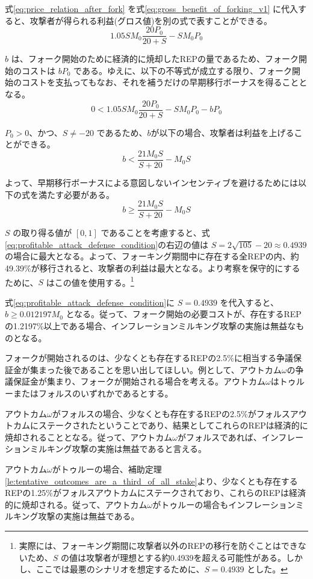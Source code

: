 \documentclass[floatfix,reprint,nofootinbib,amsmath,amssymb,epsfig,pre,floats,letterpaper,groupedaffiliation]{revtex4-1}
\newcommand{\beq}{\begin{equation}}
\newcommand{\eeq}{\end{equation}}
\theoremstyle{definition}
\theoremstyle{definition}
\theoremstyle{definition}
\begin{document}
\begin{appendix}
式\ref{eq:price_relation_after_fork} を式\ref{eq:gross_benefit_of_forking_v1} に代入すると、攻撃者が得られる利益(グロス値)を別の式で表すことができる。
\beq\label{eq:gross_benefit_of_forking_v2}
1.05SM_{0}\frac{20P_{0}}{20+S}-SM_{0}P_{0}
\eeq

$b$ は、フォーク開始のために経済的に焼却したREPの量であるため、フォーク開始のコストは $bP_0$ である。ゆえに、以下の不等式が成立する限り、フォーク開始のコストを支払ってもなお、それを補うだけの早期移行ボーナスを得ることとなる。
\beq\label{eq:profitable_attack_inequality}
0<1.05SM_{0}\frac{20P_{0}}{20+S}-SM_{0}P_{0}-bP_{0}
\eeq

$P_{0}>0$、かつ、$S \neq -20$ であるため、$b$が以下の場合、攻撃者は利益を上げることができる。
\beq\label{eq:profitable_attack_inequality_simplified}
b < \frac{21M_{0}S}{S+20}-M_{0}S
\eeq

よって、早期移行ボーナスによる意図しないインセンティブを避けるためには以下の式を満たす必要がある。
\beq\label{eq:profitable_attack_defense_condition}
b \geq \frac{21M_{0}S}{S+20}-M_{0}S
\eeq

$S$ の取り得る値が $[0,1]$ であることを考慮すると、式\ref{eq:profitable_attack_defense_condition}の右辺の値は $S=2\sqrt{105}-20 \approx 0.4939$ の場合に最大となる。よって、フォーキング期間中に存在する全REPの内、約49.39\%が移行されると、攻撃者の利益は最大となる。より考察を保守的にするために、$S$ はこの値を使用する。\footnote{実際には、フォーキング期間に攻撃者以外のREPの移行を防ぐことはできないため、$S$ の値は攻撃者が理想とする約0.4939を超える可能性がある。しかし、ここでは最悪のシナリオを想定するために、$S = 0.4939$ とした。}

式\ref{eq:profitable_attack_defense_condition}に $S=0.4939$ を代入すると、$b \geq 0.012197M_{0}$ となる。従って、フォーク開始の必要コストが、存在するREPの1.2197\%以上である場合、インフレーションミルキング攻撃の実施は無益なものとなる。

フォークが開始されるのは、少なくとも存在するREPの2.5\%に相当する争議保証金が集まった後であることを思い出してほしい。例として、アウトカム$\omega$の争議保証金が集まり、フォークが開始される場合を考える。アウトカム$\omega$はトゥルーまたはフォルスのいずれかであるとする。

アウトカム$\omega$がフォルスの場合、少なくとも存在するREPの2.5\%がフォルスアウトカムにステークされたということであり、結果としてこれらのREPは経済的に焼却されることとなる。従って、アウトカム$\omega$がフォルスであれば、インフレーションミルキング攻撃の実施は無益であると言える。

アウトカム$\omega$がトゥルーの場合、補助定理\ref{le:tentative_outcomes_are_a_third_of_all_stake}より、少なくとも存在するREPの1.25\%がフォルスアウトカムにステークされており、これらのREPは経済的に焼却される。従って、アウトカム$\omega$がトゥルーの場合もインフレーションミルキング攻撃の実施は無益である。


\end{appendix}
\end{document}
